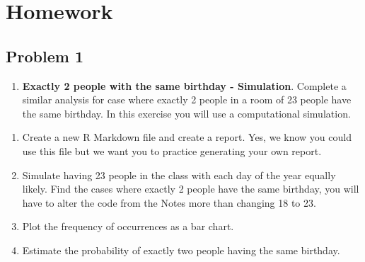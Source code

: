 \documentclass[
]{book}
\newenvironment{Shaded}{\begin{snugshade}}{\end{snugshade}}
\newcommand{\DataTypeTok}[1]{\textcolor[rgb]{0.13,0.29,0.53}{#1}}
\newcommand{\DecValTok}[1]{\textcolor[rgb]{0.00,0.00,0.81}{#1}}
\newcommand{\KeywordTok}[1]{\textcolor[rgb]{0.13,0.29,0.53}{\textbf{#1}}}
\newcommand{\NormalTok}[1]{#1}
\newcommand{\OperatorTok}[1]{\textcolor[rgb]{0.81,0.36,0.00}{\textbf{#1}}}
\newcommand{\OtherTok}[1]{\textcolor[rgb]{0.56,0.35,0.01}{#1}}
\newcommand{\StringTok}[1]{\textcolor[rgb]{0.31,0.60,0.02}{#1}}
\providecommand{\tightlist}{%
  \setlength{\itemsep}{0pt}\setlength{\parskip}{0pt}}
\begin{document}
\hypertarget{homework-6}{%
\section{Homework}\label{homework-6}}

\hypertarget{problem-1-6}{%
\subsection{Problem 1}\label{problem-1-6}}

\begin{enumerate}
\def\labelenumi{\arabic{enumi}.}
\tightlist
\item
  \textbf{Exactly 2 people with the same birthday - Simulation}. Complete a similar analysis for case where exactly 2 people in a room of 23 people have the same birthday. In this exercise you will use a computational simulation.
\end{enumerate}

\begin{enumerate}
\def\labelenumi{\alph{enumi}.}
\item
  Create a new R Markdown file and create a report. Yes, we know you could use this file but we want you to practice generating your own report.
\item
  Simulate having 23 people in the class with each day of the year equally likely. Find the cases where exactly 2 people have the same birthday, you will have to alter the code from the Notes more than changing 18 to 23.
\item
  Plot the frequency of occurrences as a bar chart.
\item
  Estimate the probability of exactly two people having the same birthday.
\end{enumerate}

\begin{Shaded}
\end{Shaded}
\end{document}
